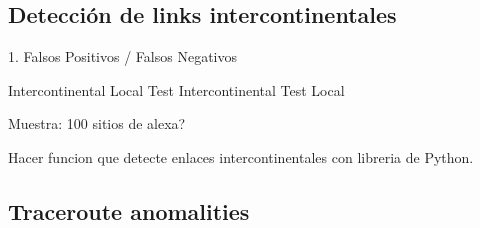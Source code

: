 \subsection{Detección de links intercontinentales}

1. Falsos Positivos / Falsos Negativos


            Intercontinental     Local
Test Intercontinental
Test Local

Muestra: 100 sitios de alexa?

Hacer funcion que detecte enlaces intercontinentales con libreria de Python.

\subsection{Traceroute anomalities}

